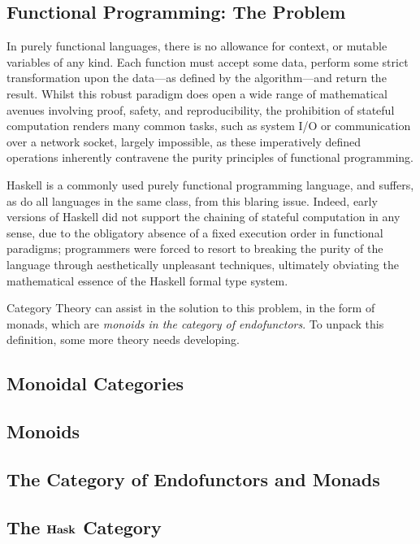 \documentclass[10pt,a4paper]{amsart}
\begin{document}
\subsection{Functional Programming: The Problem} In purely functional languages,
there is no allowance for context, or mutable variables of any kind. Each
function must accept some data, perform some strict transformation upon the
data---as defined by the algorithm---and return the result. Whilst this robust
paradigm does open a wide range of mathematical avenues involving proof, safety,
and reproducibility, the prohibition of stateful computation renders many common
tasks, such as system I/O or communication over a network socket, largely
impossible, as these imperatively defined operations inherently contravene the
purity principles of functional programming.

Haskell is a commonly used purely functional programming language, and
suffers, as do all languages in the same class, from this blaring issue.
Indeed, early versions of Haskell did not support the chaining of stateful
computation in any sense, due to the obligatory absence of a fixed execution
order in functional paradigms; programmers were forced to resort to breaking the
purity of the language through aesthetically unpleasant techniques, ultimately
obviating the mathematical essence of the Haskell formal type system.

Category Theory can assist in the solution to this problem, in the form of
monads, which are \emph{monoids in the category of endofunctors}. To unpack this
definition, some more theory needs developing.

\subsection{Monoidal Categories}
\subsection{Monoids}
\subsection{The Category of Endofunctors and Monads}
\subsection{The $\operatorname{\text{\textbf{Hask}}}$ Category}

\printbibliography[title=Cited Works]
\end{document}

